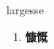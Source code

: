 
\begin{frame}
{\huge largesse}
\begin{center}
\begin{enumerate}\Large
  \item \textbf{慷慨}
\end{enumerate}
\end{center}
\end{frame}
